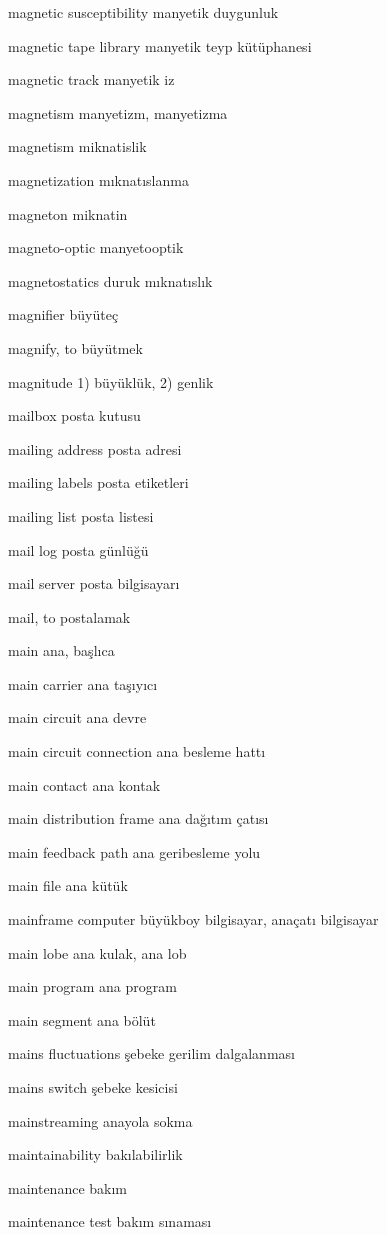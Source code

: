 \documentclass[12pt,fleqn]{article}\usepackage{../../common}
\begin{document}
magnetic susceptibility manyetik duygunluk

magnetic tape library manyetik teyp kütüphanesi

magnetic track manyetik iz

magnetism manyetizm, manyetizma

magnetism miknatislik

magnetization mıknatıslanma

magneton miknatin

magneto-optic manyetooptik

magnetostatics duruk mıknatıslık

magnifier büyüteç

magnify, to büyütmek

magnitude 1) büyüklük, 2) genlik

mailbox posta kutusu

mailing address posta adresi

mailing labels posta etiketleri

mailing list posta listesi

mail log posta günlüğü

mail server posta bilgisayarı

mail, to postalamak

main ana, başlıca

main carrier ana taşıyıcı

main circuit ana devre

main circuit connection ana besleme hattı

main contact ana kontak

main distribution frame ana dağıtım çatısı

main feedback path ana geribesleme yolu

main file ana kütük

mainframe computer büyükboy bilgisayar, anaçatı bilgisayar

main lobe ana kulak, ana lob

main program ana program

main segment ana bölüt

mains fluctuations şebeke gerilim dalgalanması

mains switch şebeke kesicisi

mainstreaming anayola sokma

maintainability bakılabilirlik

maintenance bakım

maintenance test bakım sınaması
\end{document}
